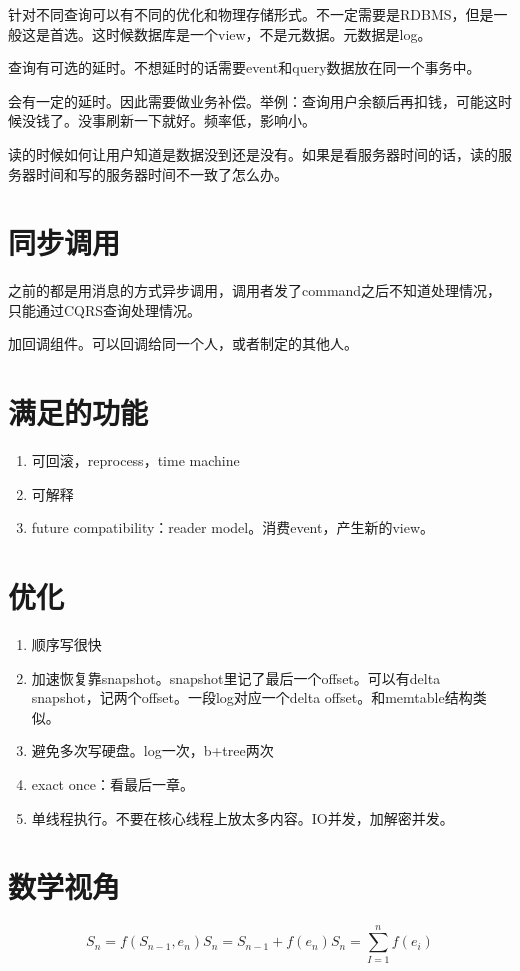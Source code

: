针对不同查询可以有不同的优化和物理存储形式。不一定需要是RDBMS，但是一般这是首选。这时候数据库是一个view，不是元数据。元数据是log。


查询有可选的延时。不想延时的话需要event和query数据放在同一个事务中。

会有一定的延时。因此需要做业务补偿。举例：查询用户余额后再扣钱，可能这时候没钱了。没事刷新一下就好。频率低，影响小。

读的时候如何让用户知道是数据没到还是没有。如果是看服务器时间的话，读的服务器时间和写的服务器时间不一致了怎么办。


\section{同步调用}

之前的都是用消息的方式异步调用，调用者发了command之后不知道处理情况，只能通过CQRS查询处理情况。

加回调组件。可以回调给同一个人，或者制定的其他人。

\section{满足的功能}
\begin{enumerate}
    \item 可回滚，reprocess，time machine
    \item 可解释
    \item future compatibility：reader model。消费event，产生新的view。
\end{enumerate}



\section{优化}
\begin{enumerate}
    \item 顺序写很快
    \item 加速恢复靠snapshot。snapshot里记了最后一个offset。可以有delta snapshot，记两个offset。一段log对应一个delta offset。和memtable结构类似。
    \item 避免多次写硬盘。log一次，b+tree两次
    \item exact once：看最后一章。
    \item 单线程执行。不要在核心线程上放太多内容。IO并发，加解密并发。
\end{enumerate}

\section{数学视角}
\begin{equation}
   S_n = f(S_{n-1}, e_n)
    S_n = S_{n-1} + f(e_n) 
    S_n = \sum_{I=1}^n f(e_i) 
\end{equation}



